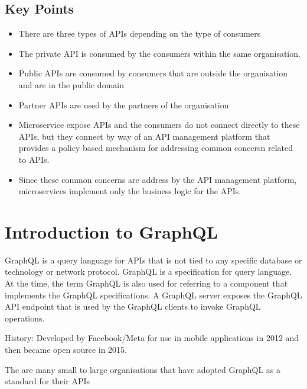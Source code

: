 \subsection{Key Points}
\begin{itemize}
    \item There are three types of APIs depending on the type of consumers
    \item The private API is consumed by the consumers within the same organisation.
    \item Public APIs are consumed by consumers that are outside the organisation and are in the public domain
    \item Partner APIs are used by the partners of the organisation
    \item Microservice expose APIs and the consumers do not connect directly to these APIs, but they connect by way of an API management platform that provides a policy based mechanism for addressing common concersn related to APIs.
    \item Since these common concerns are address by the API management platform, microservices implement only the business logic for the APIs.
\end{itemize}



\section{Introduction to GraphQL}

GraphQL is a query language for APIs that is not tied to any specific database or technology or network protocol.
GraphQL is a specification for query language.
At the time, the term GraphQL is also used for referring to a component that implements the GraphQL specifications.
A GraphQL server exposes the GraphQL API endpoint that is used by the GraphQL clients to invoke GraphQL operations.

\begin{note}
    History: Developed by Facebook/Meta for use in mobile applications in 2012 and then became open source in 2015.
\end{note}

The are many small to large organisations that have adopted GraphQL as a standard for their APIs

